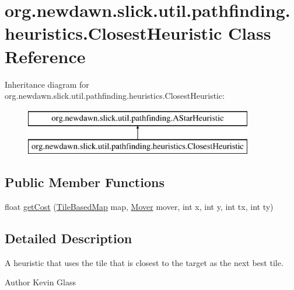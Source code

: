 \hypertarget{classorg_1_1newdawn_1_1slick_1_1util_1_1pathfinding_1_1heuristics_1_1_closest_heuristic}{}\section{org.\+newdawn.\+slick.\+util.\+pathfinding.\+heuristics.\+Closest\+Heuristic Class Reference}
\label{classorg_1_1newdawn_1_1slick_1_1util_1_1pathfinding_1_1heuristics_1_1_closest_heuristic}
Inheritance diagram for org.\+newdawn.\+slick.\+util.\+pathfinding.\+heuristics.\+Closest\+Heuristic\+:\begin{figure}[H]
\begin{center}
\leavevmode
\includegraphics[height=2.000000cm]{classorg_1_1newdawn_1_1slick_1_1util_1_1pathfinding_1_1heuristics_1_1_closest_heuristic}
\end{center}
\end{figure}
\subsection*{Public Member Functions}
\begin{DoxyCompactItemize}
\item 
float \mbox{\hyperlink{classorg_1_1newdawn_1_1slick_1_1util_1_1pathfinding_1_1heuristics_1_1_closest_heuristic_a2f983a6c190b2a3c76a873b2b4e4d40b}{get\+Cost}} (\mbox{\hyperlink{interfaceorg_1_1newdawn_1_1slick_1_1util_1_1pathfinding_1_1_tile_based_map}{Tile\+Based\+Map}} map, \mbox{\hyperlink{interfaceorg_1_1newdawn_1_1slick_1_1util_1_1pathfinding_1_1_mover}{Mover}} mover, int x, int y, int tx, int ty)
\end{DoxyCompactItemize}


\subsection{Detailed Description}
A heuristic that uses the tile that is closest to the target as the next best tile.

\begin{DoxyAuthor}{Author}
Kevin Glass 
\end{DoxyAuthor}


